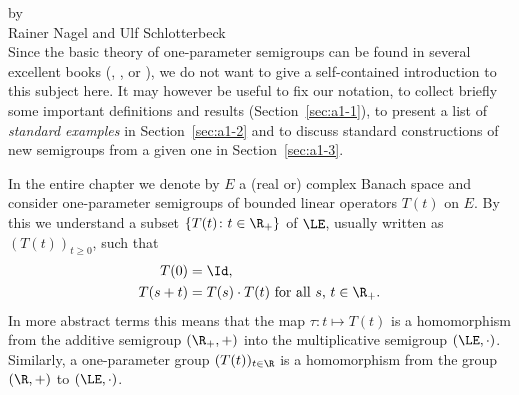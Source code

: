 \setcounter{section}{0}
\label{chap:a1}%
\thispagestyle{empty}
{\Large
\vspace*{-.75cm}
by \\[.25em]
Rainer Nagel and Ulf Schlotterbeck 
\vspace{.75cm}
\\
}
Since the basic theory of one-parameter semigroups can be found in several excellent books (\eg \textcite{davies:1980}, \textcite{goldstein:1985a}, \textcite{pazy:1983} or \textcite{hillephillips:1957}), we do not want to give a self-contained introduction to this subject here.
It may however be useful to fix our notation, to collect briefly some important definitions and results (Section~\ref{sec:a1-1}), to present a list of \emph{standard examples} in Section~\ref{sec:a1-2} %
and to discuss standard constructions of new semigroups from a given one in Section~\ref{sec:a1-3}.

In the entire chapter we denote by $E$ a (real or) complex Banach space and consider one-parameter semigroups of bounded linear operators $T(t)$ on $E$.
By this we understand a subset $\{T(t) \colon  t \in \R_{+}\}$ of\/ $\LE$, usually written as $(T(t))_{t\geq0}$, such that
\begin{align*}
	T(0) &= \Id, \\
	T(s+t) &= T(s) \cdot T(t) \text{ for all $s$, $t \in \R_{+}$.}
\end{align*}
In more abstract terms this means that the map $ \tau \colon t \mapsto T(t)$ is a homomorphism from the additive semigroup $(\R_{+},+)$ into the multiplicative semigroup $(\LE,\cdot)$.
Similarly, a one-parameter group $(T(t))_{t\in\R}$ is a homomorphism from the group  $(\R,+)$ to $(\LE,\cdot)$.
